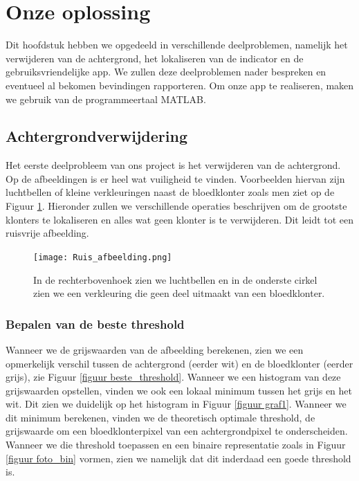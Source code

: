 \documentclass[a4paper,kulak]{kulakarticle}
\begin{document}
	\section{Onze oplossing}
		Dit hoofdstuk hebben we opgedeeld in verschillende deelproblemen, namelijk het verwijderen van de achtergrond, het lokaliseren van de indicator en de gebruiksvriendelijke app. We zullen deze deelproblemen nader bespreken en eventueel al bekomen bevindingen rapporteren. Om onze app te realiseren, maken we gebruik van de programmeertaal MATLAB.

		\subsection{Achtergrondverwijdering}
			Het eerste deelprobleem van ons project is het verwijderen van de achtergrond. Op de afbeeldingen is er heel wat vuiligheid te vinden. Voorbeelden hiervan zijn luchtbellen of kleine verkleuringen naast de bloedklonter zoals men ziet op de Figuur \ref{figuur achtergrondverwijdering}. Hieronder zullen we verschillende operaties beschrijven om de grootste klonters te lokaliseren en alles wat geen klonter is te verwijderen. Dit leidt tot een ruisvrije afbeelding.

		\begin{figure}[H]
			\centering
			\texttt{[image: Ruis\_afbeelding.png]}	
			\caption{In de rechterbovenhoek zien we luchtbellen en in de onderste cirkel zien we een verkleuring die geen deel uitmaakt van een bloedklonter.}
			\label{figuur achtergrondverwijdering}
		\end{figure}

	\subsubsection{Bepalen van de beste threshold}
		Wanneer we de grijswaarden van de afbeelding berekenen, zien we een opmerkelijk verschil tussen de achtergrond (eerder wit) en de bloedklonter (eerder grijs),  zie Figuur \ref{figuur beste_threshold}. Wanneer we een histogram van deze grijswaarden opstellen, vinden we ook een lokaal minimum tussen het grijs en het wit. Dit zien we duidelijk op het histogram in Figuur \ref{figuur graf1}. Wanneer we dit minimum berekenen, vinden we de theoretisch optimale threshold, de grijswaarde om een bloedklonterpixel van een achtergrondpixel te onderscheiden. Wanneer we die threshold toepassen en een binaire representatie zoals in Figuur \ref{figuur foto_bin} vormen, zien we namelijk dat dit inderdaad een goede threshold is.
\end{document}
